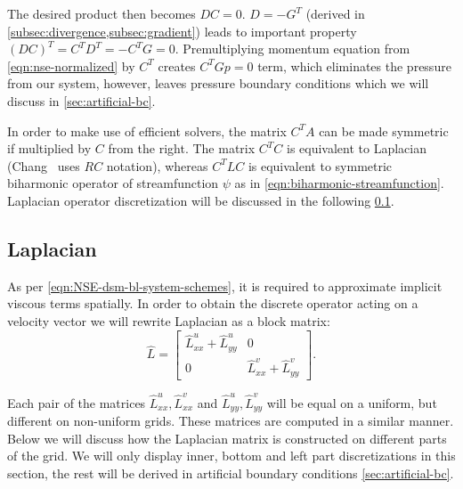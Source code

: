 \documentclass{article}
\numberwithin{equation}{section}
\begin{document}
The desired product then becomes $DC=0$. $D=-G^T$ (derived in \cref{subsec:divergence,subsec:gradient}) leads to important property $(DC)^T=C^TD^T=-C^TG=0$. Premultiplying momentum equation from \cref{eqn:nse-normalized} by $C^T$ creates $C^TGp=0$ term, which  eliminates the pressure from our system, however, leaves pressure boundary conditions which we will discuss in \cref{sec:artificial-bc}.

In order to make use of efficient solvers, the matrix $C^TA$ can be made symmetric if multiplied by $C$ from the right. The matrix $C^TC$ is equivalent to Laplacian (Chang~\cite{Chang:2002} uses $RC$ notation), whereas $C^TLC$ is equivalent to symmetric biharmonic operator of streamfunction $\psi$ as in \cref{eqn:biharmonic-streamfunction}. Laplacian operator discretization will be discussed in the following \cref{sec:laplacian}.



\subsection{Laplacian}\label{sec:laplacian}
As per \cref{eqn:NSE-dsm-bl-system-schemes}, it is required to approximate implicit viscous terms spatially. In order to obtain the discrete operator acting on a velocity vector we will rewrite Laplacian as a block matrix:
\begin{equation*}
	\hat L=
	\begin{bmatrix}
  \hat{L}^u_{xx}+\hat{L}^u_{yy} & 0 \\
  0 & \hat{L}^v_{xx}+\hat{L}^v_{yy}
\end{bmatrix}.
\end{equation*}

Each pair of the matrices $\hat{L}^u_{xx},\hat{L}^v_{xx}$ and $\hat{L}^u_{yy},\hat{L}^v_{yy}$ will be equal on a uniform, but different on non-uniform grids. These matrices are computed in a similar manner. Below we will discuss how the Laplacian matrix is constructed on different parts of the grid. We will only display inner, bottom and left part discretizations in this section, the rest will be derived in artificial boundary conditions \cref{sec:artificial-bc}.
\end{document}
